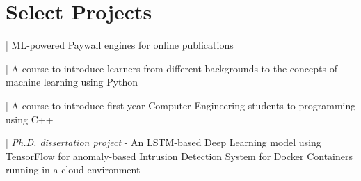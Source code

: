 \section{Select Projects}
 |
ML-powered Paywall engines for online publications
\sectionsep

 |
A course to introduce learners from different backgrounds to the concepts of machine learning using Python
\sectionsep

 |
A course to introduce first-year Computer Engineering students to programming using C++
\sectionsep

 |
\textit{Ph.D. dissertation project} - An LSTM-based Deep Learning model using TensorFlow for anomaly-based Intrusion Detection System for Docker Containers running in a cloud environment
\sectionsep
